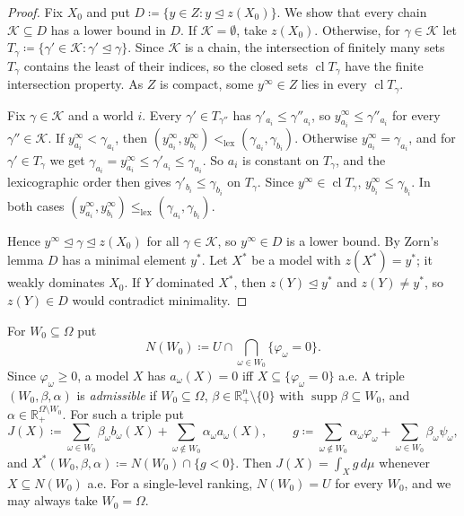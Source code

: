 \documentclass[11pt]{article}
\newcommand{\R}{\mathbb{R}}
\newcommand{\lexle}{\le_{\mathrm{lex}}}
\newcommand{\lexlt}{<_{\mathrm{lex}}}
\DeclareMathOperator{\supp}{supp}
\DeclareMathOperator{\cl}{cl}
\theoremstyle{plain}
\theoremstyle{definition}
\theoremstyle{remark}
\begin{document}
\begin{proof}
Fix $X_0$ and put $D\coloneqq\{y\in Z:y\trianglelefteq z(X_0)\}$. We show that every chain
$\mathcal K\subseteq D$ has a lower bound in $D$. If $\mathcal K=\emptyset$, take
$z(X_0)$. Otherwise, for $\gamma\in\mathcal K$ let $T_\gamma\coloneqq\{\gamma'\in
\mathcal K:\gamma'\trianglelefteq\gamma\}$. Since $\mathcal K$ is a chain, the intersection
of finitely many sets $T_\gamma$ contains the least of their indices, so the closed sets
$\cl T_\gamma$ have the finite intersection property. As $Z$ is compact, some $y^\infty\in
Z$ lies in every $\cl T_\gamma$.

Fix $\gamma\in\mathcal K$ and a world $i$. Every $\gamma'\in T_{\gamma''}$ has
$\gamma'_{a_i}\le\gamma''_{a_i}$, so $y^\infty_{a_i}\le\gamma''_{a_i}$ for every
$\gamma''\in\mathcal K$. If $y^\infty_{a_i}<\gamma_{a_i}$, then
$(y^\infty_{a_i},y^\infty_{b_i})\lexlt(\gamma_{a_i},\gamma_{b_i})$. Otherwise
$y^\infty_{a_i}=\gamma_{a_i}$, and for $\gamma'\in T_\gamma$ we get $\gamma_{a_i}=
y^\infty_{a_i}\le\gamma'_{a_i}\le\gamma_{a_i}$. So $a_i$ is constant on $T_\gamma$, and
the lexicographic order then gives $\gamma'_{b_i}\le\gamma_{b_i}$ on $T_\gamma$. Since
$y^\infty\in\cl T_\gamma$, $y^\infty_{b_i}\le\gamma_{b_i}$. In both cases
$(y^\infty_{a_i},y^\infty_{b_i})\lexle(\gamma_{a_i},\gamma_{b_i})$.

Hence $y^\infty\trianglelefteq\gamma\trianglelefteq z(X_0)$ for all $\gamma\in\mathcal K$,
so $y^\infty\in D$ is a lower bound. By Zorn's lemma $D$ has a minimal element $y^\ast$.
Let $X^\ast$ be a model with $z(X^\ast)=y^\ast$; it weakly dominates $X_0$. If $Y$
dominated $X^\ast$, then $z(Y)\trianglelefteq y^\ast$ and $z(Y)\neq y^\ast$, so $z(Y)\in
D$ would contradict minimality.
\end{proof}

For $W_0\subseteq\Omega$ put
\[
  N(W_0)\coloneqq U\cap\bigcap_{\omega\in W_0}\{\varphi_\omega=0\}.
\]
Since $\varphi_\omega\ge0$, a model $X$ has $a_\omega(X)=0$ iff $X\subseteq
\{\varphi_\omega=0\}$ a.e. A triple $(W_0,\beta,\alpha)$ is \emph{admissible} if
$W_0\subseteq\Omega$, $\beta\in\R^n_+\setminus\{0\}$ with $\supp\beta\subseteq W_0$, and
$\alpha\in\R_+^{\Omega\setminus W_0}$. For such a triple put
\[
  J(X)\coloneqq\sum_{\omega\in W_0}\beta_\omega b_\omega(X)
    +\sum_{\omega\notin W_0}\alpha_\omega a_\omega(X),\qquad
  g\coloneqq\sum_{\omega\notin W_0}\alpha_\omega\varphi_\omega+\sum_{\omega\in W_0}
  \beta_\omega\psi_\omega,
\]
and $X^\ast(W_0,\beta,\alpha)\coloneqq N(W_0)\cap\{g<0\}$. Then $J(X)=\int_Xg\,d\mu$
whenever $X\subseteq N(W_0)$ a.e. For a single-level ranking, $N(W_0)=U$ for every $W_0$,
and we may always take $W_0=\Omega$.
\end{document}
